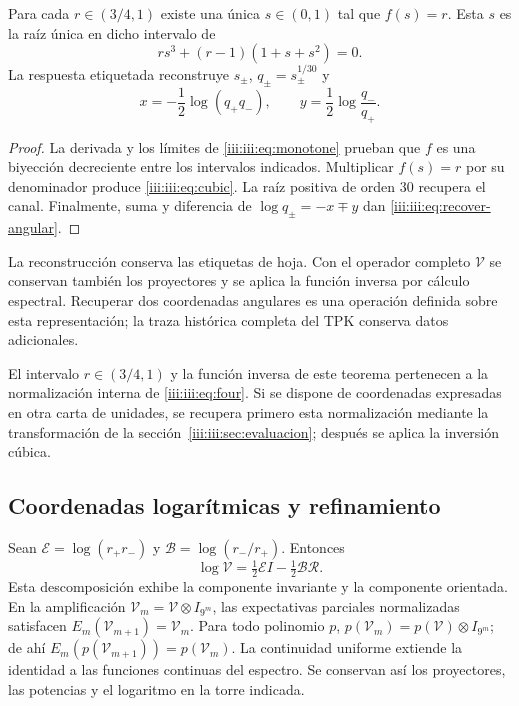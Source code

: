 \begin{theorem}
Para cada $r\in(3/4,1)$ existe una única $s\in(0,1)$ tal que $f(s)=r$.
Esta $s$ es la raíz única en dicho intervalo de
\begin{equation}
 r s^3+(r-1)(1+s+s^2)=0.
 \label{iii:iii:eq:cubic}
\end{equation}
La respuesta etiquetada reconstruye $s_\pm$, $q_\pm=s_\pm^{1/30}$ y
\begin{equation}
 x=-\frac12\log(q_+q_-),\qquad
 y=\frac12\log\frac{q_-}{q_+}.
 \label{iii:iii:eq:recover-angular}
\end{equation}
\end{theorem}
\begin{proof}
La derivada y los límites de \eqref{iii:iii:eq:monotone} prueban que $f$ es una
biyección decreciente entre los intervalos indicados. Multiplicar $f(s)=r$
por su denominador produce \eqref{iii:iii:eq:cubic}. La raíz positiva de orden
$30$ recupera el canal. Finalmente, suma y diferencia de
$\log q_\pm=-x\mp y$ dan \eqref{iii:iii:eq:recover-angular}.
\end{proof}

La reconstrucción conserva las etiquetas de hoja. Con el operador completo
$\mathcal V$ se conservan también los proyectores y se aplica la función
inversa por cálculo espectral. Recuperar dos coordenadas angulares es una
operación definida sobre esta representación; la traza histórica completa
del TPK conserva datos adicionales.

El intervalo $r\in(3/4,1)$ y la función inversa de este teorema pertenecen
a la normalización interna de \eqref{iii:iii:eq:four}. Si se dispone de
coordenadas expresadas en otra carta de unidades, se recupera primero
esta normalización mediante la transformación de la
sección~\ref{iii:iii:sec:evaluacion}; después se aplica la inversión cúbica.

\subsection{Coordenadas logarítmicas y refinamiento}

Sean $\mathcal E=\log(r_+r_-)$ y $\mathcal B=\log(r_-/r_+)$. Entonces
\begin{equation}
 \log\mathcal V=\tfrac12\mathcal E I-\tfrac12\mathcal B\mathcal R.
 \label{iii:iii:eq:logvac}
\end{equation}
Esta descomposición exhibe la componente invariante y la componente orientada.
En la amplificación $\mathcal V_m=\mathcal V\otimes I_{9^m}$, las
expectativas parciales normalizadas satisfacen
$E_m(\mathcal V_{m+1})=\mathcal V_m$. Para todo polinomio $p$,
$p(\mathcal V_m)=p(\mathcal V)\otimes I_{9^m}$; de ahí
$E_m(p(\mathcal V_{m+1}))=p(\mathcal V_m)$. La continuidad uniforme
extiende la identidad a las funciones continuas del espectro. Se conservan
así los proyectores, las potencias y el logaritmo en la torre indicada.

